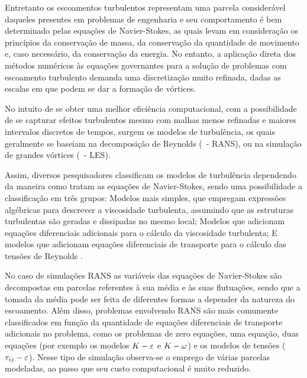 Entretanto os escoamentos turbulentos representam uma parcela considerável daqueles presentes em problemas de engenharia e seu comportamento é bem determinado pelas equações de Navier-Stokes, as quais levam em consideração os princípios da conservação de massa, da conservação da quantidade de movimento e, caso necessário, da conservação da energia. No entanto, a aplicação direta dos métodos numéricos às equações governantes para a solução de problemas com escoamento turbulento demanda uma discretização muito refinada, dadas as escalas em que podem se dar a formação de vórtices.



No intuito de se obter uma melhor eficiência computacional, com a possibilidade de se capturar efeitos turbulentos mesmo com malhas menos refinadas e maiores intervalos discretos de tempos, surgem os modelos de turbulência, os quais geralmente se baseiam na decomposição de Reynolds (\RANS\ - RANS), ou na simulação de grandes vórtices (\LES\ - LES).

Assim, diversos pesquisadores classificam os modelos de turbulência dependendo da maneira como tratam as equações de Navier-Stokes, sendo uma possibilidade a classificação em três grupos: Modelos mais simples, que empregam expressões algébricas para descrever a viscosidade turbulenta, assumindo que as estruturas turbulentas são geradas e dissipadas no mesmo local; Modelos que adicionam equações diferenciais adicionais para o cálculo da viscosidade turbulenta; E modelos que adicionam equações diferenciais de transporte para o cálculo das tensões de Reynolds \cite{souza2011revisao,alfonsi2009reynolds,teixeira2001simulaccao}.

No caso de simulações RANS as variáveis das equações de Navier-Stokes são decompostas em parcelas referentes à sua média e às suas flutuações, sendo que a tomada da média pode ser feita de diferentes formas a depender da natureza do escoamento. Além disso, problemas envolvendo RANS são mais comumente classificados em função da quantidade de equações diferenciais de transporte adicionais no problema, como os problemas de zero equações, uma equação, duas equações (por exemplo os modelos $K-\varepsilon$ e $K-\omega$) e os modelos de tensões ($\tau_{ij}-\varepsilon$). Nesse tipo de simulação observa-se o emprego de várias parcelas modeladas, ao passo que seu custo computacional é muito reduzido.

